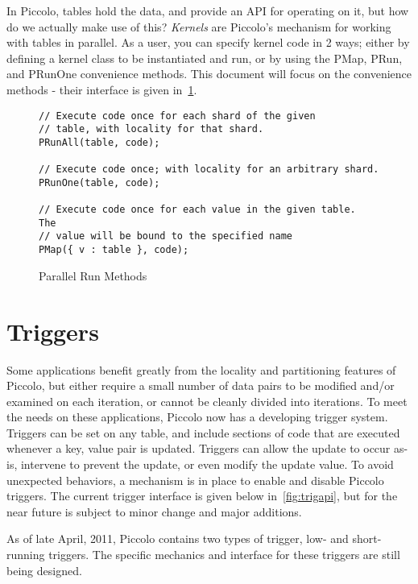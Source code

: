 \documentclass[10pt]{article}
\newcommand{\p}{Piccolo\xspace}
\begin{document}
In \p, tables hold the data, and provide an API for operating on it, but how do
we actually make use of this?  {\em Kernels} are \p's mechanism for working with
tables in parallel.  As a user, you can specify kernel code in 2 ways; either by
defining a kernel class to be instantiated and run, or by using the PMap, PRun,
and PRunOne convenience methods.  This document will focus on the convenience
methods - their interface is given in~\ref{fig:methodapi}.

 \begin{figure}[h!]
\begin{lstlisting}
// Execute code once for each shard of the given 
// table, with locality for that shard.
PRunAll(table, code);

// Execute code once; with locality for an arbitrary shard.
PRunOne(table, code);

// Execute code once for each value in the given table.  The
// value will be bound to the specified name
PMap({ v : table }, code);
\end{lstlisting}
\caption{\sffamily Parallel Run Methods}
\label{fig:methodapi}
\end{figure}

\section{Triggers}
Some applications benefit greatly from the locality and partitioning features of
\p, but either require a small number of data pairs to be modified and/or
examined on each iteration, or cannot be cleanly divided into iterations. To meet
the needs on these applications, \p now has a developing trigger system.  Triggers
can be set on any table, and include sections of code that are executed whenever
a key, value pair is updated.  Triggers can allow the update to occur as-is,
intervene to prevent the update, or even modify the update value.  To avoid
unexpected behaviors, a mechanism is in place to enable and disable Piccolo
triggers.  The current trigger interface is given below in~\ref{fig:trigapi}, but
for the near future is subject to minor change and major additions.

As of late April, 2011, \p contains two types of trigger, low- and short-running
triggers.  The specific mechanics and interface for these triggers are still being
designed.
\end{document}
